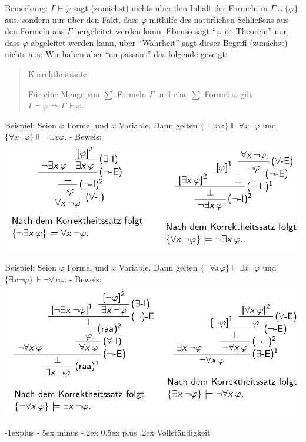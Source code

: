 \documentclass[a4paper]{article}
\makeatletter
\renewcommand{\subsection}{\@startsection{subsection}{2}{0mm}%
                {-1explus -.5ex minus -.2ex}%
                {0.5ex plus .2ex}%
                {\normalfont\normalsize\bfseries}}
\makeatother
\begin{document}
\begin{multicols}{3}
  Bemerkung: $\Gamma\vdash\varphi$ sagt (zunächst) nichts über den Inhalt
  der Formeln in $\Gamma\cup\{\varphi\}$ aus, sondern nur über den Fakt,
  dass $\varphi$ mithilfe des natürlichen Schließens aus den Formeln aus
  $\Gamma$ hergeleitet werden kann. Ebenso sagt ``$\varphi$ ist Theorem''
  nur, dass $\varphi$ abgeleitet werden kann, über ``Wahrheit'' sagt
  dieser Begriff (zunächst) nichts aus. Wir haben aber ``en passant'' das
  folgende gezeigt:

  \begin{quote}
    Korrektheitssatz

    Für eine Menge von $\sum$-Formeln $\Gamma$ und eine $\sum$-Formel
    $\varphi$ gilt $\Gamma\vdash\varphi \Rightarrow \Gamma\Vdash\varphi$.
  \end{quote}

  Beispiel: Seien $\varphi$ Formel und $x$ Variable. Dann gelten
  $\{\lnot\exists x\varphi\}\Vdash\forall x\lnot\varphi$ und
  $\{\forall x\lnot\varphi\}\Vdash\lnot\exists x\varphi$. - Beweis:
  \includegraphics[width=\linewidth]{Assets/Logik-korrekheitssatz.png}

  Beispiel: Seien $\varphi$ Formel und $x$ Variable. Dann gelten
  $\{\lnot\forall x\varphi\}\Vdash \exists x\lnot\varphi$ und
  $\{\exists x\lnot\varphi\}\Vdash\lnot\forall x\varphi$. - Beweis:
  \includegraphics[width=\linewidth]{Assets/Logik-beispiel-korrekheitssatz.png}

  \subsection{Vollständigkeit}\label{vollstuxe4ndigkeit-1}


\end{multicols}
\end{document}
